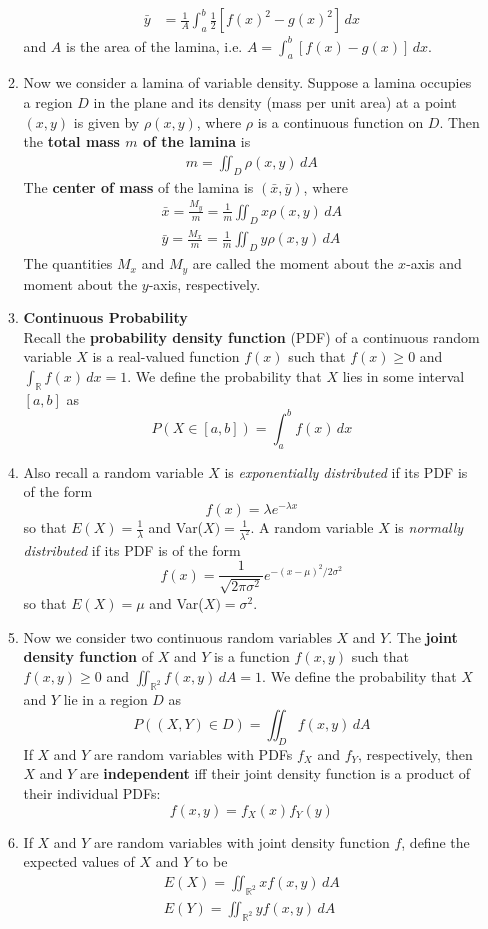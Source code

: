 \documentclass[10pt]{article}
\begin{document}
\begin{multicols}{2}
\begin{enumerate}
\begin{enumerate}
\begin{align*}
            \bar{y} &= \frac{1}{A} \int_a^b \frac{1}{2} [f(x)^2 - g(x)^2] \,dx\textbf{}
        \end{align*}
        and $A$ is the area of the lamina, i.e. $A=\int_a^b [f(x) - g(x)] \,dx$. 
    \item Now we consider a lamina of variable density. Suppose a lamina occupies a region $D$ in the plane and its density (mass per unit area) at a point $(x,y)$ is given by $\rho(x,y)$, where $\rho$ is a continuous function on $D$. Then the \textbf{total mass $m$ of the lamina} is 
    \begin{align*}
        m = \iint_D \rho(x,y) \,dA
    \end{align*}
   The \textbf{center of mass} of the lamina is $(\bar{x}, \bar{y})$, where
   \begin{align*}
       \bar{x} = \frac{M_y}{m} = \frac{1}{m} \iint_D x \rho(x,y) \,dA \\
       \bar{y} = \frac{M_x}{m} = \frac{1}{m} \iint_D y \rho(x,y) \,dA 
   \end{align*}
   The quantities $M_x$ and $M_y$ are called the moment about the $x$-axis and moment about the $y$-axis, respectively.
   \item \textbf{Continuous Probability} \\ Recall the \textbf{probability density function} (PDF) of a continuous random variable $X$ is a real-valued function $f(x)$ such that $f(x) \geq 0$ and $\int_{\mathbb{R}} f(x) \,dx=1$. We define the probability that $X$ lies in some interval $[a,b]$ as $$P(X \in [a,b]) = \int_a^b f(x) \,dx$$
   \item Also recall a random variable $X$ is \textit{exponentially distributed} if its PDF is of the form $$f(x) = \lambda e^{-\lambda x}$$ so that $E(X) = \frac{1}{\lambda}$ and Var($X)=\frac{1}{\lambda^2}$. A random variable $X$ is \textit{normally distributed} if its PDF is of the form $$f(x) = \frac{1}{\sqrt{2\pi\sigma^2}}e^{-(x-\mu)^2 / 2\sigma^2}$$ so that $E(X)=\mu$ and Var($X)=\sigma^2$.
   \item Now we consider two continuous random variables $X$ and $Y$. The \textbf{joint density function} of $X$ and $Y$ is a function $f(x,y)$ such that $f(x,y) \geq 0$ and $\iint_{\mathbb{R}^2} f(x,y) \,dA = 1$. We define the probability that $X$ and $Y$ lie in a region $D$ as 
   $$P((X,Y) \in D) = \iint_D f(x,y) \,dA$$
   If $X$ and $Y$ are random variables with PDFs $f_X$ and $f_Y$, respectively, then $X$ and $Y$ are \textbf{independent} iff their joint density function is a product of their individual PDFs: $$f(x,y) = f_X(x) f_Y(y)$$
   \item If $X$ and $Y$ are random variables with joint density function $f$, define the expected values of $X$ and $Y$ to be
   \begin{align*}
       E(X) = \iint_{\mathbb{R}^2} x f(x,y) \,dA \\
       E(Y) = \iint_{\mathbb{R}^2} y f(x,y) \,dA 
   \end{align*}
    

\end{enumerate}
\end{enumerate}
\end{multicols}
\end{document}
